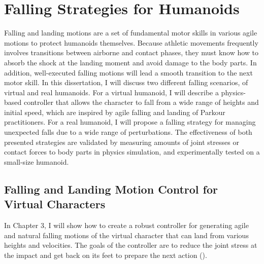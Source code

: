 \section{Falling Strategies for Humanoids}
Falling and landing motions are a set of fundamental motor skills
in various agile motions to protect humanoids themselves.
Because athletic movements frequently involves
transitions between airborne and contact phases, they must know how to
absorb the shock at the landing moment and avoid damage to the body parts.
In addition, well-executed falling motions will lead a smooth transition to the
next motor skill. 
In this dissertation, I will discuss two different falling scenarios, 
of virtual and real humanoids.
For a virtual humanoid, I will describe a physics-based controller that allows
the character to fall from a wide range of heights and initial speed, 
which are inspired by agile falling and landing of Parkour practitioners.
For a real humanoid, I will propose a falling strategy for managing unexpected
falls due to a wide range of perturbations.
The effectiveness of both presented strategies are validated by measuring
amounts of joint stresses or contact forces to body parts in physics
simulation, and experimentally tested on a small-size humanoid.

\subsection{Falling and Landing Motion Control for Virtual Characters}

In Chapter 3, I will show how to create a robust controller for generating 
agile and natural falling motions of the virtual character that can land from 
various heights and velocities.
The goals of the controller are to reduce the joint stress at the impact and
get back on its feet to prepare the next action ().

